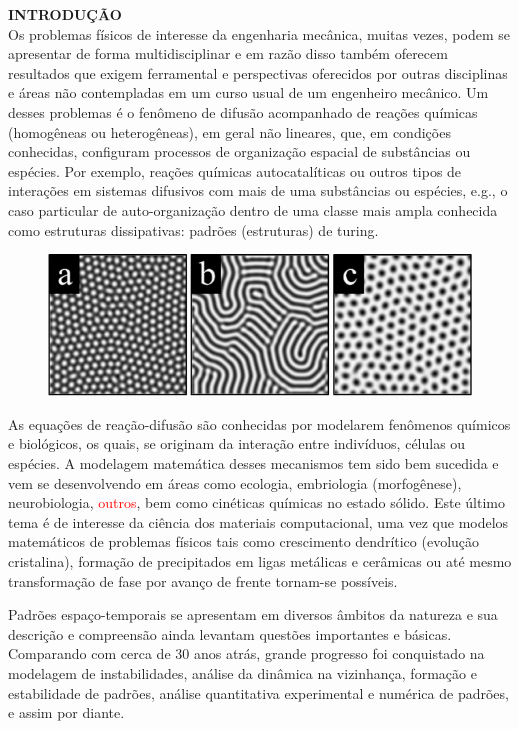 \noindent\textbf{INTRODUÇÃO}
$\!$\\
\indent Os problemas físicos de interesse da engenharia mecânica, muitas vezes, podem se apresentar de forma multidisciplinar e em razão disso também oferecem resultados que exigem ferramental e perspectivas oferecidos por outras disciplinas e áreas não contempladas em um curso usual de um engenheiro mecânico. Um desses problemas é o fenômeno de difusão acompanhado de reações químicas (homogêneas ou heterogêneas), em geral não lineares, que, em condições conhecidas, configuram processos de organização espacial de substâncias ou espécies. Por exemplo, reações químicas autocatalíticas ou outros tipos de interações em sistemas difusivos com mais de uma substâncias ou espécies, e.g., o caso particular de auto-organização dentro de uma classe mais ampla conhecida como estruturas dissipativas: padrões (estruturas) de turing.\par
\begin{figure}[H]
\centering
\includegraphics[scale=0.5]{01_Pre_textuais/turing2.PNG}
\end{figure}
As equações de reação-difusão são conhecidas por modelarem fenômenos químicos e biológicos, os quais, se originam da interação entre indivíduos, células ou espécies. A modelagem matemática desses mecanismos tem sido bem sucedida e vem se desenvolvendo em áreas como ecologia, embriologia (morfogênese), neurobiologia, \textcolor{red}{outros}, bem como cinéticas químicas no estado sólido. Este último tema é de interesse da ciência dos materiais computacional, uma vez que modelos matemáticos de problemas físicos tais como crescimento dendrítico (evolução cristalina), formação de precipitados em ligas metálicas e cerâmicas ou até mesmo transformação de fase por avanço de frente tornam-se possíveis.\par
Padrões espaço-temporais se apresentam em diversos âmbitos da natureza e sua descrição e compreensão ainda levantam questões importantes e básicas. Comparando com cerca de 30 anos atrás, grande progresso foi conquistado na modelagem de instabilidades, análise da dinâmica na vizinhança, formação e estabilidade de padrões, análise quantitativa experimental e numérica de padrões, e assim por diante. \par
